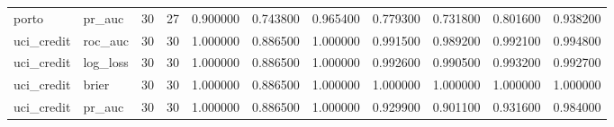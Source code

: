 \begin{longtable}{llrrrrrrrrr}
porto & pr\_auc & 30 & 27 & 0.900000 & 0.743800 & 0.965400 & 0.779300 & 0.731800 & 0.801600 & 0.938200 \\
uci\_credit & roc\_auc & 30 & 30 & 1.000000 & 0.886500 & 1.000000 & 0.991500 & 0.989200 & 0.992100 & 0.994800 \\
uci\_credit & log\_loss & 30 & 30 & 1.000000 & 0.886500 & 1.000000 & 0.992600 & 0.990500 & 0.993200 & 0.992700 \\
uci\_credit & brier & 30 & 30 & 1.000000 & 0.886500 & 1.000000 & 1.000000 & 1.000000 & 1.000000 & 1.000000 \\
uci\_credit & pr\_auc & 30 & 30 & 1.000000 & 0.886500 & 1.000000 & 0.929900 & 0.901100 & 0.931600 & 0.984000 \\
\end{longtable}\endgroup\addtocounter{table}{-1}
